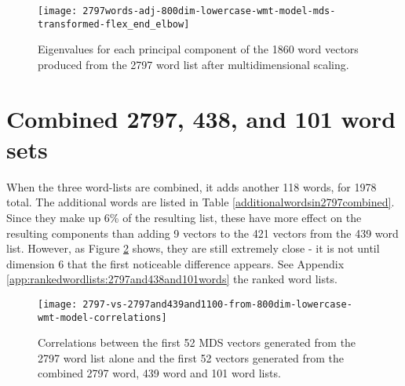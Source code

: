 \documentclass[eric_thesis.tex]{subfiles}
\begin{document}
\begin{figure}[tbp]
    \texttt{[image: 2797words-adj-800dim-lowercase-wmt-model-mds-transformed-flex\_end\_elbow]}
    \caption{Eigenvalues for each principal component of the 1860 word vectors
    produced from the 2797 word list after multidimensional scaling.}
    \label{fig:2797wordsmdseigenvalues}
\end{figure}


\section{Combined 2797, 438, and 101 word sets}

When the three word-lists are combined, it adds another 118 words, for 1978
total. The additional words are listed in Table 
\ref{additionalwordsin2797combined}. Since they make up 6\% of the resulting
list, these have more effect on the resulting
components than adding 9 vectors to the 421 vectors from the 439 word list.
However, as Figure \ref{fig:2797vs2797and439and100} shows, they are still
extremely close - it is not until dimension 6 that the first noticeable
difference appears. See Appendix \ref{app:rankedwordlists:2797and438and101words}
the ranked word lists.


\begin{figure}[tbp]
    \texttt{[image: 2797-vs-2797and439and1100-from-800dim-lowercase-wmt-model-correlations]}
    \caption{Correlations between the first 52 MDS vectors generated from the 
    2797 word list alone and the first 52 vectors generated from the combined
    2797 word, 439 word and 101 word lists.}
    \label{fig:2797vs2797and439and100}
\end{figure}
\end{document}
